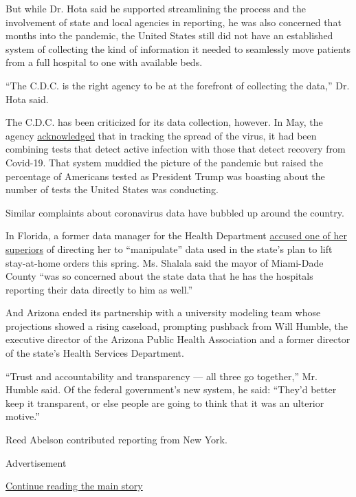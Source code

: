 But while Dr. Hota said he supported streamlining the process and the
involvement of state and local agencies in reporting, he was also
concerned that months into the pandemic, the United States still did not
have an established system of collecting the kind of information it
needed to seamlessly move patients from a full hospital to one with
available beds.

``The C.D.C. is the right agency to be at the forefront of collecting
the data,'' Dr. Hota said.

The C.D.C. has been criticized for its data collection, however. In May,
the agency
\href{https://www.nytimes.com/2020/05/22/us/politics/coronavirus-tests-cdc.html}{acknowledged}
that in tracking the spread of the virus, it had been combining tests
that detect active infection with those that detect recovery from
Covid-19. That system muddied the picture of the pandemic but raised the
percentage of Americans tested as President Trump was boasting about the
number of tests the United States was conducting.

Similar complaints about coronavirus data have bubbled up around the
country.

In Florida, a former data manager for the Health Department
\href{https://www.tampabay.com/news/health/2020/05/22/ousted-manager-was-told-to-manipulate-covid-19-data-before-states-re-opening-she-says/}{accused
one of her superiors} of directing her to ``manipulate'' data used in
the state's plan to lift stay-at-home orders this spring. Ms. Shalala
said the mayor of Miami-Dade County ``was so concerned about the state
data that he has the hospitals reporting their data directly to him as
well.''

And Arizona ended its partnership with a university modeling team whose
projections showed a rising caseload, prompting pushback from Will
Humble, the executive director of the Arizona Public Health Association
and a former director of the state's Health Services Department.

``Trust and accountability and transparency --- all three go together,''
Mr. Humble said. Of the federal government's new system, he said:
``They'd better keep it transparent, or else people are going to think
that it was an ulterior motive.''

Reed Abelson contributed reporting from New York.

Advertisement

\protect\hyperlink{after-bottom}{Continue reading the main story}

